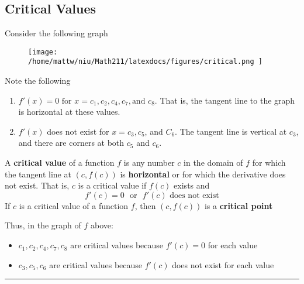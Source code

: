 \documentclass{report}
\begin{document}
\subsection*{Critical Values}
Consider the following graph
\begin{figure}[ht]
\centering
\texttt{[image:  /home/mattw/niu/Math211/latexdocs/figures/critical.png ]}
\end{figure}
\bigbreak \noindent
Note the following
\begin{enumerate}
  \item $f'(x) = 0 \text{ for } x = c_1, c_2, c_4, c_7, \text{and }  c_8$. That is, the tangent line to the graph is horizontal at these values.
  \item $f'(x)$ does not exist for $ x = c_3, c_5$, and $C_6$. The tangent line is vertical at $c_3$, and there are corners at both $c_5$ and $c_6$.
\end{enumerate}
\pagebreak
\begin{mdframed}
  A \textbf{critical value}  of a function $f$ is any number $c$ in the domain of $f$ for which the tangent line at $(c,f(c))$ is \textbf{horizontal} or for which the derivative does not exist.
  \bigbreak \noindent
  That is, $c$ is a critical value if $f(c)$ exists and
  $$ f'(c) = 0 \ \ \ \text{or} \ \ \ f'(c) \text{ does not exist}$$
If $c$ is a critical value of a function $f$, then $(c,f(c))$ is a \textbf{critical point}
\end{mdframed}
Thus, in the graph of $f$ above:
\begin{itemize}
  \item $c_1, c_2,c_4,c_7,c_8$ are critical values because $f'(c) = 0$ for each value 
  \item $c_3,c_5,c_6$ are critical values because $f'(c)$ does not exist for each value
  \bigbreak \noindent
\end{itemize}
  \bigbreak \noindent
  \hrule
  \bigbreak
\end{document}
